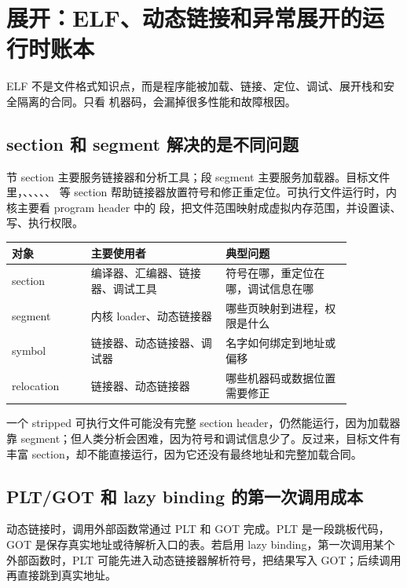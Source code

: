\section{展开：ELF、动态链接和异常展开的运行时账本}

ELF 不是文件格式知识点，而是程序能被加载、链接、定位、调试、展开栈和安全隔离的合同。只看  机器码，会漏掉很多性能和故障根因。

\subsection{section 和 segment 解决的是不同问题}

节 section 主要服务链接器和分析工具；段 segment 主要服务加载器。目标文件里，、、、、、 等 section 帮助链接器放置符号和修正重定位。可执行文件运行时，内核主要看 program header 中的  段，把文件范围映射成虚拟内存范围，并设置读、写、执行权限。

\begin{center}
\begin{tabular}{p{0.20\linewidth}p{0.34\linewidth}p{0.32\linewidth}}
\toprule
对象 & 主要使用者 & 典型问题 \\
\midrule
section & 编译器、汇编器、链接器、调试工具 & 符号在哪，重定位在哪，调试信息在哪 \\
segment & 内核 loader、动态链接器 & 哪些页映射到进程，权限是什么 \\
symbol & 链接器、动态链接器、调试器 & 名字如何绑定到地址或偏移 \\
relocation & 链接器、动态链接器 & 哪些机器码或数据位置需要修正 \\
\bottomrule
\end{tabular}
\end{center}

一个 stripped 可执行文件可能没有完整 section header，仍然能运行，因为加载器靠 segment；但人类分析会困难，因为符号和调试信息少了。反过来，目标文件有丰富 section，却不能直接运行，因为它还没有最终地址和完整加载合同。

\subsection{PLT/GOT 和 lazy binding 的第一次调用成本}

动态链接时，调用外部函数常通过 PLT 和 GOT 完成。PLT 是一段跳板代码，GOT 是保存真实地址或待解析入口的表。若启用 lazy binding，第一次调用某个外部函数时，PLT 可能先进入动态链接器解析符号，把结果写入 GOT；后续调用再直接跳到真实地址。

